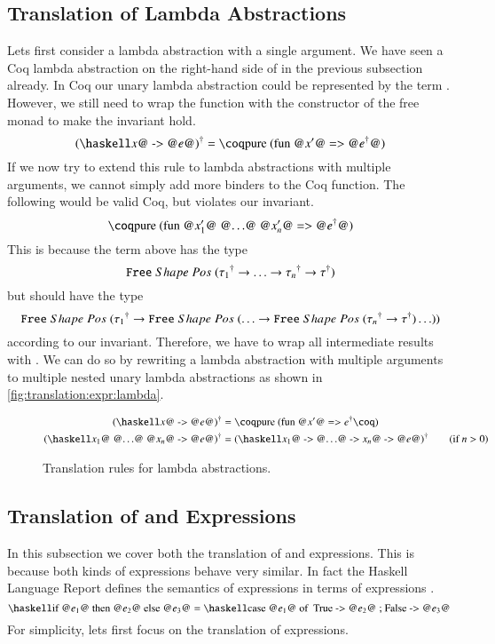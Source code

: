 \subsection{Translation of Lambda Abstractions} \label{sec:translation:expr:lambda}
Lets first consider a lambda abstraction  with a single argument.
We have seen a Coq lambda abstraction on the right-hand side of \coq{>>=} in the previous subsection already.
In Coq our unary lambda abstraction could be represented by the term .
However, we still need to wrap the function with the  constructor of the free monad to make the invariant hold.
\[
  \toCoq{(\haskellM{\@$x$@ -> @$e$@})} = \coqM{pure (fun @$x'$@ => @$\toCoqX{e}$@)}
\]
If we now try to extend this rule to lambda abstractions  with multiple arguments, we cannot simply add more binders to the Coq function.
The following would be valid Coq, but violates our invariant.
\[
  \coqM{pure (fun @$x_1'$@ @$\ldots$@ @$x_n'$@ => @$\toCoqX{e}$@)}
\]
This is because the term above has the type
\[
  {\texttt{Free}}\;Shape\;Pos\;{({\tau_1}^{\dagger}
    \rightarrow \ldots
    \rightarrow {\tau_n}^{\dagger}
    \rightarrow {\tau}^{\dagger})}
\]
but should have the type
\[
  {\texttt{Free}}\;Shape\;Pos\;{({\tau_1}^{\dagger}
    \rightarrow {\texttt{Free}}\;Shape\;Pos\;{(\ldots
    \rightarrow {\texttt{Free}}\;Shape\;Pos\;{({\tau_n}^{\dagger}
    \rightarrow {\tau}^{\dagger})} \ldots)})}
\]
according to our invariant.
Therefore, we have to wrap all intermediate results with .
We can do so by rewriting a lambda abstraction with multiple arguments to multiple nested unary lambda abstractions as shown in \autoref{fig:translation:expr:lambda}.

\begin{figure}[H]
  \begin{align*}
    \toCoq{(\haskellM{\@$x$@ -> @$e$@})} &= \coqM{pure (fun @$x'$@ =>}\;\toCoq{e}\coqM{)} \\
    \toCoq{(\haskellM{\@$x_1$@ @$\ldots$@ @$x_n$@ -> @$e$@})} &= \toCoq{(\haskellM{\@$x_1$@ -> @$\ldots$@ -> \@$x_n$@ -> @$e$@})}
    \tag{if $n > 0$}
  \end{align*}
  \caption{Translation rules for lambda abstractions.}
  \label{fig:translation:expr:lambda}
\end{figure}

\subsection{Translation of  and  Expressions}
In this subsection we cover both the translation of  and  expressions.
This is because both kinds of expressions behave very similar.
In fact the Haskell Language Report defines the semantics of  expressions in terms of  expressions \cite[p.~20]{Marlow:2010}.
\[
  \haskellM{if @$e_1$@ then @$e_2$@ else @$e_3$@}
    = \haskellM{case @$e_1$@ of { True -> @$e_2$@ ; False -> @$e_3$@ }}
\]
For simplicity, lets first focus on the translation of  expressions.

